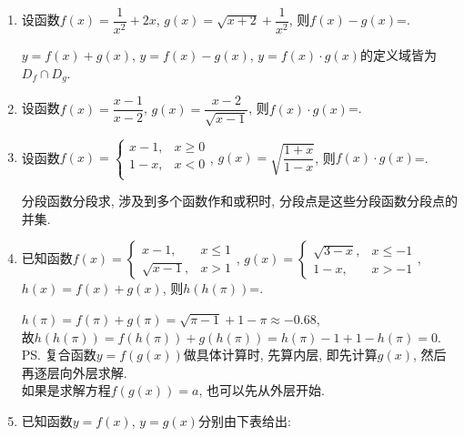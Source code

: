 \begin{enumerate}

\item 设函数$f(x)=\dfrac{1}{x^2}+2x$, $g(x)=\sqrt{x+2}+\dfrac{1}{x^2}$, 则$f(x)-g(x)$=. 
\begin{jieda}
$y=f(x)+g(x)$, $y=f(x)-g(x)$, $y=f(x)\cdot g(x)$的定义域皆为$D_f\cap D_g$. 
\end{jieda}

\item 设函数$f(x)=\dfrac{x-1}{x-2}$, $g(x)=\dfrac{x-2}{\sqrt{x-1}}$, 则$f(x)\cdot g(x)$=.


\item 设函数$f(x)=\begin{cases}
x-1, & x\geq 0\\
1-x, & x<0\\
\end{cases}$, 
$g(x)=\sqrt{\dfrac{1+x}{1-x}}$, 则$f(x)\cdot g(x)$=\blkda[4.2]{$\begin{cases}
\sqrt{1-x^2},  & x\in[-1,0)\\
-\sqrt{1-x^2}, & x\in[0,1)
\end{cases}$}. 
\begin{jieda}
分段函数分段求, 涉及到多个函数作和或积时, 分段点是这些分段函数分段点的并集. 
\end{jieda}


\item 已知函数$f(x)=\begin{cases}
x-1, & x\leq 1\\
\sqrt{x-1}, & x>1
\end{cases}$, 
$g(x)=\begin{cases}
\sqrt{3-x}, & x\leq -1\\
1-x, & x>-1
\end{cases}$, 
$h(x)=f(x)+g(x)$, 
则$h(h(\pi))$=. 
\begin{jieda}
$h(\pi)=f(\pi)+g(\pi)=\sqrt{\pi-1}+1-\pi\approx-0.68$, \\
故$h(h(\pi))=f(h(\pi))+g(h(\pi))=h(\pi)-1+1-h(\pi)=0$. \\
\ps 复合函数$y=f(g(x))$做具体计算时, 先算内层, 即先计算$g(x)$, 然后再逐层向外层求解. \\
如果是求解方程$f(g(x))=a$, 也可以先从外层开始. 
\end{jieda}

\item 已知函数$y=f(x)$, $y=g(x)$分别由下表给出: 


\end{enumerate}
